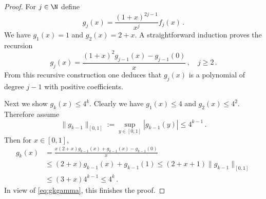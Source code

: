 \begin{proof}
For $j \in \N$ define
\begin{equation}\label{eq:gkgamma}
g_j(x)= \frac{(1+x)^{2j-1}}{x^j} f_j(x)\,.
\end{equation}
We have $g_1(x)=1$ and $g_2(x)=2+x$. A straightforward induction proves the recursion
\begin{equation}\label{eq:gkgammarec}
g_j(x)= \frac{(1+x)^2 g_{j-1}(x)-g_{j-1}(0)}{x}\,, \quad j\ge 2\,.
\end{equation}
From this recursive construction one deduces that $g_j(x)$ is a polynomial of degree $j-1$ with positive coefficients.

Next we show $g_k(x)\le 4^k$. Clearly we have $g_1(x)\le 4$ and $g_2(x)\le 4^2$. Therefore assume
\begin{equation*}
\| g_{k-1}\|_{[0,1]} := \sup_{y\in [0,1]} |g_{k-1}(y)| \le 4^{k-1}\,.
\end{equation*}
Then for $x\in [0,1]$,
\begin{equation*}
\begin{split}
g_k(x) &= \frac{x (2+x) g_{k-1}(x)+g_{k-1}(x)-g_{k-1}(0)}{x}\\
&\le (2+x) g_{k-1}(x)+g_{k-1}(1) \le (2+x+1) \| g_{k-1}\|_{[0,1]}\\
&\le (3+x) 4^{k-1} \le 4^k\,.
\end{split}
\end{equation*}
In view of \eqref{eq:gkgamma}, this finishes the proof.
\end{proof}






